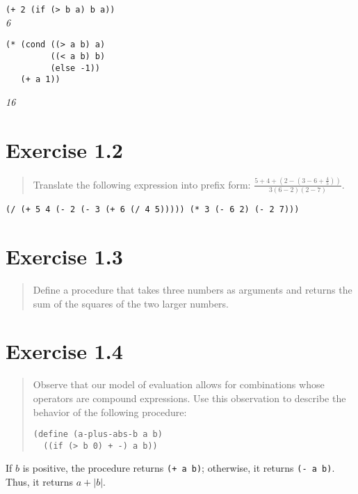 \documentclass{article}
\begin{document}
\noindent \lstinline|(+ 2 (if (> b a) b a))| \\
\emph{6}

\begin{lstlisting}
(* (cond ((> a b) a)
         ((< a b) b)
         (else -1))
   (+ a 1))
\end{lstlisting}
\emph{16}

\section{Exercise 1.2}
\begin{quote}
    Translate the following expression into prefix form:
    \begin{math}
        \frac{5+4+(2-(3-6+\frac{4}{5}))}{3(6-2)(2-7)}
    \end{math}.
\end{quote}

\lstinline|(/ (+ 5 4 (- 2 (- 3 (+ 6 (/ 4 5))))) (* 3 (- 6 2) (- 2 7)))|

\section{Exercise 1.3}
\begin{quote}
	Define a procedure that takes three numbers as arguments and returns the sum
	of the squares of the two larger numbers.
\end{quote}



\section{Exercise 1.4}
\begin{quote}
	Observe that our model of evaluation allows for combinations whose operators
    are compound expressions. Use this observation to describe the behavior of
    the following procedure:
    \begin{lstlisting}
(define (a-plus-abs-b a b)
  ((if (> b 0) + -) a b))
    \end{lstlisting}
\end{quote}

If $b$ is positive, the procedure returns \verb|(+ a b)|; otherwise, it returns
\verb|(- a b)|. Thus, it returns $a + |b|$.
\end{document}
